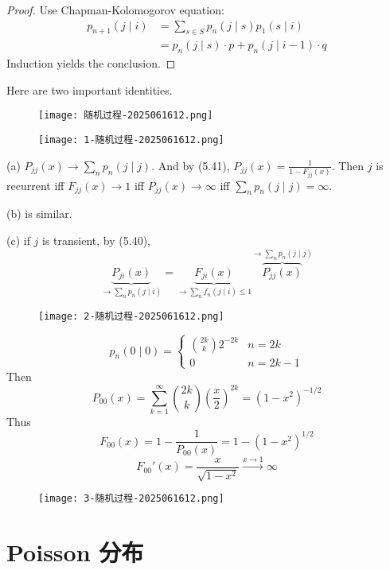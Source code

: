 \begin{proof}
Use Chapman-Kolomogorov equation:
\[
\begin{aligned}
p_{n+1}(j\mid i) & =\sum_{s\in S}p_n(j\mid s)p_1(s\mid i) \\
 & =p_n(j\mid s)\cdot p+p_n(j\mid i-1)\cdot q 
\end{aligned}
\]
Induction yields the conclusion.
\end{proof}
Here are two important identities.

\begin{figure}[H]
\centering
\texttt{[image: 随机过程-2025061612.png]}
\label{}
\end{figure}

\begin{figure}[H]
\centering
\texttt{[image: 1-随机过程-2025061612.png]}
\label{}
\end{figure}

(a)
$P_{jj}(x)\to \sum_{n}p_n(j\mid j)$. And by (5.41), $P_{jj}(x)=\frac{1}{1-F_{jj}(x)}$. Then $j$ is recurrent iff $F_{jj}(x)\to1$ iff $P_{jj}(x)\to \infty$ iff $\sum_{n}p_n(j\mid j)=\infty$.

(b) is similar.

(c) if $j$ is transient, by (5.40),
\[
\underbrace{ P_{ji}(x) }_{ \to \sum_{n}p_n(j\mid i) }=\underbrace{ F_{ji}(x) }_{ \to \sum_{n}f_n(j\mid i)\leq 1 }\overbrace{ P_{jj}(x) }^{ \to \sum_{n}p_n(j\mid j)}
\]
\begin{figure}[H]
\centering
\texttt{[image: 2-随机过程-2025061612.png]}
\label{}
\end{figure}
\[
p_n(0\mid 0)=\begin{cases}
\binom{2k}{k} 2^{-2k} & n=2k \\
0 & n=2k-1 
\end{cases}
\]
Then
\[
P_{00}(x)=\sum_{k=1}^{\infty} \binom{2k}{k} \left( \frac{x}{2} \right)^{2k}=(1-x^{2})^{-1/2 }
\]
Thus
\[
F_{00}(x)=1-\frac{1}{P_{00}(x)}=1-(1-x^{2})^{1/2 }
\]
\[
F_{00}'(x)=\frac{x}{\sqrt{ 1-x^{2} }}\overset{ x\to1 }{ \to } \infty
\]
\begin{figure}[H]
\centering
\texttt{[image: 3-随机过程-2025061612.png]}
\label{}
\end{figure}

\section{Poisson 分布}

